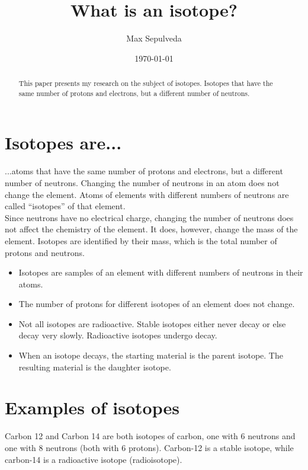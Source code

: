 \documentclass[letterpaper,12pt]{article}
\begin{document}
\title{What is an isotope?}
\author{Max Sepulveda}
\date{\today}
\maketitle

\begin{abstract}
This paper presents my research on the subject of isotopes. Isotopes that have the same number of protons and electrons, but a different number of neutrons.

\end{abstract}


\section{Isotopes are...}

...atoms that have the same number of protons and electrons, but a different number of neutrons. Changing the number of neutrons in an atom does not change the element. Atoms of elements with different numbers of neutrons are called ``isotopes'' of that element.
\\
Since neutrons have no electrical charge, changing the number of neutrons does not affect the chemistry of the element. It does, however, change the mass of the element. Isotopes are identified by their mass, which is the total number of protons and neutrons.

\begin{itemize}

\item Isotopes are samples of an element with different numbers of neutrons in their atoms.
\item The number of protons for different isotopes of an element does not change.
\item Not all isotopes are radioactive. Stable isotopes either never decay or else decay very slowly. Radioactive isotopes undergo decay.
\item When an isotope decays, the starting material is the parent isotope. The resulting material is the daughter isotope.

\end{itemize}

\pagebreak

\section{Examples of isotopes}

Carbon 12 and Carbon 14 are both isotopes of carbon, one with 6 neutrons and one with 8 neutrons (both with 6 protons). Carbon-12 is a stable isotope, while carbon-14 is a radioactive isotope (radioisotope).
\end{document}
